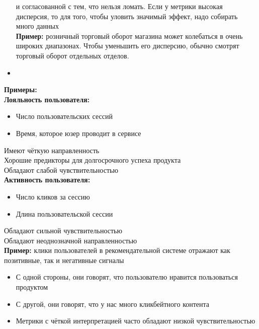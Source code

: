 \documentclass[10pt,landscape]{article}
\begin{document}
\begin{multicols}{3}
\begin{itemize}
и согласованной с тем, что нельзя ломать. Если у метрики высокая дисперсия, то для того, чтобы
уловить значимый эффект, надо собирать много данных\\
\textbf{Пример:} розничный торговый оборот магазина
может колебаться в очень широких диапазонах.
Чтобы уменьшить его дисперсию, обычно смотрят
торговый оборот отдельных отделов.
\item 
\end{itemize}
\textbf{Примеры:}\\
\textbf{Лояльность пользователя:}
\begin{itemize}
    \item Число пользовательских
сессий
    \item Время, которое юзер
проводит в сервисе
\end{itemize}
Имеют чёткую направленность\\
Хорошие предикторы для долгосрочного успеха
продукта\\
Обладают слабой чувствительностью\\
\textbf{Активность пользователя:}
\begin{itemize}
    \item Число кликов за сессию
    \item Длина пользовательской
сессии
\end{itemize}
Обладают сильной чувствительностью\\
Обладают неоднозначной направленностью\\
\textbf{Пример:} клики пользователей в рекомендательной системе
отражают как позитивные, так и негативные сигналы
\begin{itemize}
    \item С одной стороны, они говорят, что пользователю
нравится пользоваться продуктом
\item С другой, они говорят, что у нас много
кликбейтного контента
\item Метрики с чёткой интерпретацией часто обладают низкой
чувствительностью
\end{itemize}

\end{multicols}
\end{document}
